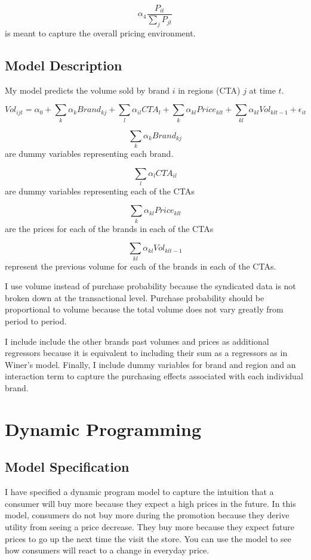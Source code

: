 \documentclass{article}
\begin{document}
$$ \alpha_4 \dfrac {P_{it}}{\sum_j P_{jt}}$$ is meant to capture the overall pricing environment.

\subsection{Model Description}

My model predicts the volume sold by brand $i$ in regions (CTA) $j$ at time $t$.

$$Vol_{ijt} = \alpha_0 + \sum_{k} \alpha_{k} Brand_{kj} + \sum_{l} \alpha_{il} CTA_{l} + \sum_{k} \alpha_{kl} Price_{klt} + \sum_{kl} \alpha_{kl} Vol_{klt-1} + \epsilon_{it}$$

$$\sum_{k} \alpha_{k} Brand_{kj}$$ are dummy variables representing each brand.

$$\sum_{l} \alpha_{l} CTA_{il}$$ are dummy variables representing each of the CTAs

$$\sum_{k} \alpha_{kl} Price_{klt}$$ are the prices for each of the brands in each of the CTAs

$$\sum_{kl} \alpha_{kl} Vol_{klt-1}$$ represent the previous volume for each of the brands in each of the CTAs.

I use volume instead of purchase probability because the syndicated data is not broken down at the transactional level. Purchase probability should be proportional to volume because the total volume does not vary greatly from period to period.

I include include the other brands past volumes and prices as additional regressors because it is equivalent to including their sum as a regressors as in Winer's model. Finally, I include dummy variables for brand and region and an interaction term to capture the purchasing effects associated with each individual brand.

\section{Dynamic Programming}

\subsection{Model Specification}

I have specified a dynamic program model to capture the intuition that a consumer will buy more because they expect a high prices in the future. In this model, consumers do not buy more during the promotion because they derive utility from seeing a price decrease. They buy more because they expect future prices to go up the next time the visit the store. You can use the model to see how consumers will react to a change in everyday price.
\end{document}
